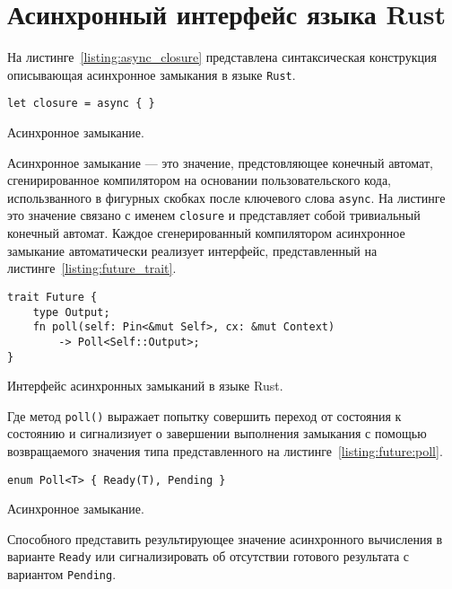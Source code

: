 \section{Асинхронный интерфейс языка Rust}

На листинге~\ref{listing:async_closure} представлена синтаксическая конструкция описывающая асинхронное замыкания в языке \verb|Rust|.

\begin{listing}[H]
    \begin{verbatim}
let closure = async { }
    \end{verbatim}

    \caption{Асинхронное замыкание.}
    \label{listing:async_closure}
\end{listing}

Асинхронное замыкание --- это значение, предстовляющее конечный автомат, сгенирированное компилятором на основании пользовательского кода, использванного в фигурных скобках после ключевого слова \verb|async|. На листинге это значение связано с именем \verb|closure| и представляет собой тривиальный конечный автомат. Каждое сгенерированный компилятором асинхронное замыкание автоматически реализует интерфейс, представленный на листинге~\ref{listing:future_trait}.

\begin{listing}[H]
    \begin{verbatim}
trait Future {
    type Output;
    fn poll(self: Pin<&mut Self>, cx: &mut Context)
        -> Poll<Self::Output>;
}
    \end{verbatim}

    \caption{Интерфейс асинхронных замыканий в языке Rust.}
    \label{listing:future_trait}
\end{listing}

Где метод \verb|poll()| выражает попытку совершить переход от состояния к состоянию и сигнализиует о завершении выполнения замыкания с помощью возвращаемого значения типа представленного на листинге~\ref{listing:future:poll}.

\begin{listing}[H]
    \begin{verbatim}
enum Poll<T> { Ready(T), Pending }
    \end{verbatim}

    \caption{Асинхронное замыкание.}
    \label{listing:future:poll}
\end{listing}

Способного представить результирующее значение асинхронного вычисления в варианте \verb|Ready| или сигнализировать об отсутствии готового результата с вариантом \verb|Pending|.

